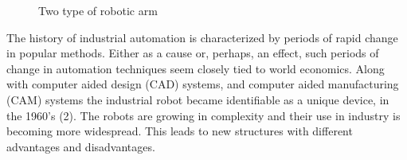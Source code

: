 \begin{figure}[H]
    \centering
    \qquad
    \caption{Two type of robotic arm}%
    \label{fig:type_of_robotic_arm}%
\end{figure}

The history of industrial automation is characterized by periods of rapid change in popular methods. Either as a cause or, perhaps, an effect, such periods of change in automation techniques seem closely tied to world economics. Along with computer aided design (CAD) systems, and computer aided manufacturing (CAM) systems the industrial robot became identifiable as a unique device, in the 1960’s (2). The robots are growing in complexity and their use in industry is becoming more widespread. This leads to new structures with different advantages and disadvantages\cite{intro_robotic_thesis}.

